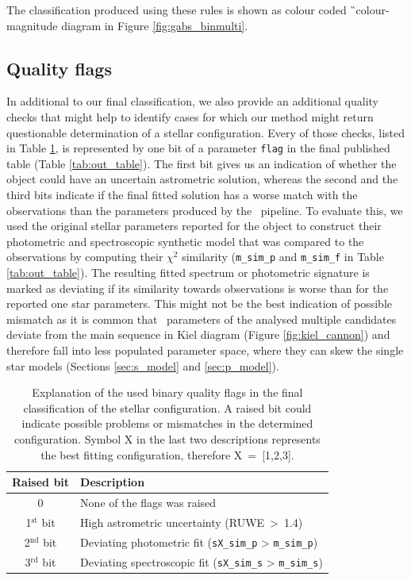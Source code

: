 The classification produced using these rules is shown as colour coded \G\ colour-magnitude diagram in Figure \ref{fig:gabs_binmulti}.

\subsection{Quality flags}
\label{sec:quaflags}
In additional to our final classification, we also provide an additional quality checks that might help to identify cases for which our method might return questionable determination of a stellar configuration. Every of those checks, listed in Table \ref{tab:q_flag}, is represented by one bit of a parameter \texttt{flag} in the final published table (Table \ref{tab:out_table}). The first bit gives us an indication of whether the object could have an uncertain astrometric solution, whereas the second and the third bits indicate if the final fitted solution has a worse match with the observations than the parameters produced by the \TC\ pipeline. To evaluate this, we used the original stellar parameters reported for the object to construct their photometric and spectroscopic synthetic model that was compared to the observations by computing their $\chi^2$ similarity (\texttt{m\_sim\_p} and \texttt{m\_sim\_f} in Table \ref{tab:out_table}). The resulting fitted spectrum or photometric signature is marked as deviating if its similarity towards observations is worse than for the reported one star parameters. This might not be the best indication of possible mismatch as it is common that \TC\ parameters of the analysed multiple candidates deviate from the main sequence in Kiel diagram (Figure \ref{fig:kiel_cannon}) and therefore fall into less populated parameter space, where they can skew the single star models (Sections \ref{sec:s_model} and \ref{sec:p_model}).

\begin{table}
	\centering
	\caption{Explanation of the used binary quality flags in the final classification of the stellar configuration. A raised bit could indicate possible problems or mismatches in the determined configuration. Symbol X in the last two descriptions represents the best fitting configuration, therefore X~=~[1,2,3].}
	\begin{tabular}{c l}
		\hline
		Raised bit & Description \\ 
		\hline
		0 & None of the flags was raised \\
		1$^{\text{st}}$ bit & High astrometric uncertainty (RUWE~>~1.4)\\
		2$^{\text{nd}}$ bit & Deviating photometric fit (\texttt{sX\_sim\_p} > \texttt{m\_sim\_p})\\
		3$^{\text{rd}}$ bit & Deviating spectroscopic fit (\texttt{sX\_sim\_s} > \texttt{m\_sim\_s})\\
		\hline
	\end{tabular}
	\label{tab:q_flag}
\end{table}

